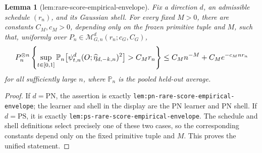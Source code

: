 \documentclass{article}
\newtheorem{lemma}{Lemma}
\begin{document}
\begin{lemma}[lem:rare-score-empirical-envelope]\label{lem:rare-score-empirical-envelope}
Fix a direction \(d\), an admissible schedule \((r_n)\), and its Gaussian shell. For every fixed \(M>0\), there are constants \(C_M,c_M>0\), depending only on the frozen primitive tuple and \(M\), such that, uniformly over \(P_n\in\mathcal M_{G,n}^d(r_n;c_G,C_G)\),
\[
\makebox[\linewidth][c]{\resizebox{0.98\linewidth}{!}{\par\noindent \makebox[\linewidth][c]{\resizebox{0.98\linewidth}{!}{\(\displaystyle \displaystyle P_n^{\otimes n}\left\{\sup_{t\in[0,1]}\mathbb P_n\bigl[\psi_{t,n}^d(O;\widehat\eta_{d,-k,n})^2\bigr]>C_Mr_n\right\}\le C_Mn^{-M}+C_Me^{-c_Mnr_n}\)}}\par\noindent}}
\]
for all sufficiently large \(n\), where \(\mathbb P_n\) is the pooled held-out average.
\end{lemma}
\begin{proof}
If \(d=\mathrm{PN}\), the assertion is exactly \texttt{lem:pn-rare-score-empirical-envelope}; the learner and shell in the display are the PN learner and PN shell. If \(d=\mathrm{PS}\), it is exactly \texttt{lem:ps-rare-score-empirical-envelope}. The schedule and shell definitions select precisely one of these two cases, so the corresponding constants depend only on the fixed primitive tuple and \(M\). This proves the unified statement.
\end{proof}
\end{document}
